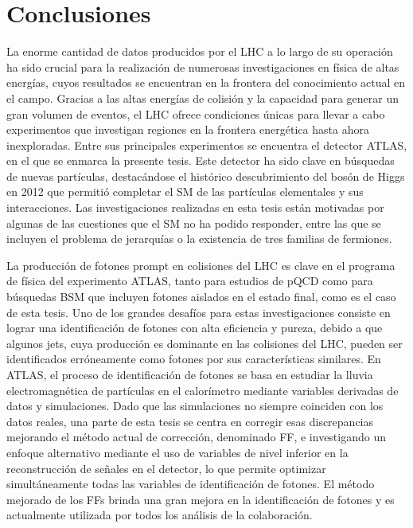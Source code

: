 \chapter*{Conclusiones}




La enorme cantidad de datos producidos por el \ac{LHC} a lo largo de su operación ha sido crucial para la realización de numerosas investigaciones en física de altas energías, cuyos resultados se encuentran en la frontera del conocimiento actual en el campo. Gracias a las altas energías de colisión y la capacidad para generar un gran volumen de eventos, el \ac{LHC} ofrece condiciones únicas para llevar a cabo experimentos que investigan regiones en la frontera energética hasta ahora inexploradas. Entre sus principales experimentos se encuentra el detector \ac{ATLAS}, en el que se enmarca la presente tesis. Este detector ha sido clave en búsquedas de nuevas partículas, destacándose el histórico descubrimiento del bosón de Higgs en 2012 que permitió completar el \ac{SM} de las partículas elementales y sus interacciones. Las investigaciones realizadas en esta tesis están motivadas por algunas de las cuestiones que el \ac{SM} no ha podido responder, entre las que se incluyen el problema de jerarquías o la existencia de tres familias de fermiones.

La producción de fotones prompt en colisiones \pp del \ac{LHC} es clave en el programa de física del experimento \ac{ATLAS}, tanto para estudios de \ac{pQCD} como para búsquedas \ac{BSM} que incluyen fotones aislados en el estado final, como es el caso de esta tesis. Uno de los grandes desafíos para estas investigaciones consiste en lograr una identificación de fotones con alta eficiencia y pureza, debido a que algunos jets, cuya producción es dominante en las colisiones del \ac{LHC}, pueden ser identificados erróneamente como fotones por sus características similares. En \ac{ATLAS}, el proceso de identificación de fotones se basa en estudiar la lluvia electromagnética  de partículas en el calorímetro mediante variables derivadas de datos y simulaciones. Dado que las simulaciones no siempre coinciden con los datos reales, una parte de esta tesis se centra en corregir esas discrepancias mejorando el método actual de corrección, denominado \acf{FF}, e investigando un enfoque alternativo mediante el uso de variables de nivel inferior en la reconstrucción de señales en el detector, lo que permite optimizar simultáneamente todas las variables de identificación de fotones. El método mejorado de los \acp{FF} brinda una gran mejora en la identificación de fotones y es actualmente utilizada por todos los análisis de la colaboración.

